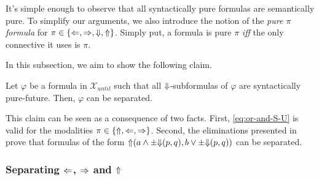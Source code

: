 \documentclass[a4paper,UKenglish,cleveref, autoref, thm-restate, numberwithinsect]{lipics-v2021}
\def\Larrow{\ensuremath\mathord{\Leftarrow}}
\def\Rarrow{\ensuremath\mathord{\Rightarrow}}
\def\Uarrow{\ensuremath\mathord{\Uparrow}}
\def\Darrow{\ensuremath\mathord{\Downarrow}}
\begin{document}
It's simple enough to observe that all syntactically pure formulas are semantically pure. To simplify our arguments, we also introduce the notion of the \textit{pure $\pi$ formula} for $\pi \in \{ \Larrow, \Rarrow, \Darrow, \Uarrow \}$. Simply put, a formula is pure $\pi$ \textit{iff} the only connective it uses is $\pi$.

In this subsection, we aim to show the following claim.
\begin{claim*}
    \label{claim:partial-separation-trees}
    Let $\varphi$ be a formula in $\mathcal{X}_{until}$ such that all $\Darrow$-subformulas of $\varphi$ are syntactically pure-future. Then, $\varphi$ can be separated.
\end{claim*}
This claim can be seen as a consequence of two facts. First, \eqref{eq:or-and-S-U} is valid for the modalities $\pi \in \{\Uarrow, \Larrow, \Rarrow\}$. Second, the eliminations presented in \cite{xpathComplete} prove that formulas of the form $\Uarrow(a \land \pm \Darrow(p, q), b \lor \pm \Darrow(p, q))$ can be separated.

\subsubsection{Separating $\Larrow$, $\Rarrow$ and $\Uarrow$}
\end{document}
